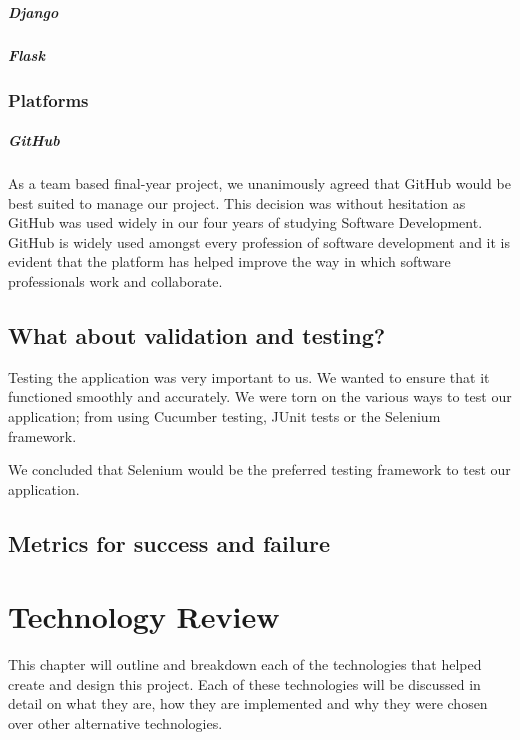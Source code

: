 \paragraph{Django}


\paragraph{Flask}


\subsection{Platforms}
\paragraph{GitHub}
As a team based final-year project, we unanimously agreed that GitHub\cite{github} would be best suited to manage our project. This decision was without hesitation as GitHub was used widely in our four years of studying Software Development. GitHub is widely used amongst every profession of software development and it is evident that the platform has helped improve the way in which software professionals work and collaborate\cite{zagalsky2015emergence}.

\section{What about validation and testing?}
Testing the application was very important to us. We wanted to ensure that it functioned smoothly and accurately. We were torn on the various ways to test our application; from using Cucumber testing, JUnit tests or the Selenium framework.

We concluded that Selenium would be the preferred testing framework to test our application.

\section{Metrics for success and failure}


\chapter{Technology Review}
This chapter will outline and breakdown each of the technologies that helped create and design this project. Each of these technologies will be discussed in detail on what they are, how they are implemented and why they were chosen over other alternative technologies.

